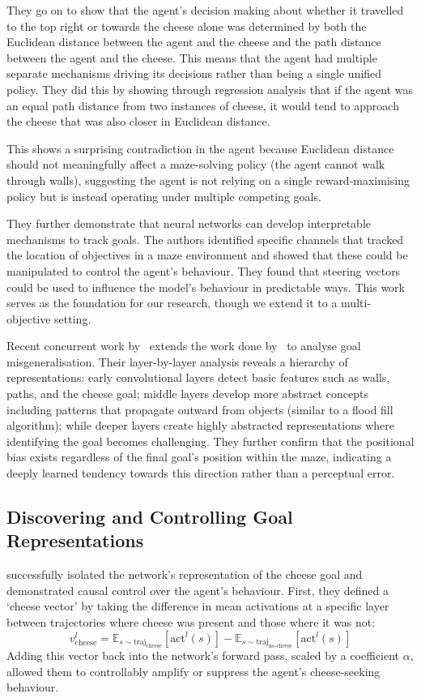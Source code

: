 They go on to show that the agent's decision making about whether it travelled to the top right or towards the cheese alone was determined by both the Euclidean distance between the agent and the cheese and the path distance between the agent and the cheese. This means that the agent had multiple separate mechanisms driving its decisions rather than being a single unified policy. They did this by showing through regression analysis that if the agent was an equal path distance from two instances of cheese, it would tend to approach the cheese that was also closer in Euclidean distance. 

This shows a surprising contradiction in the agent because Euclidean distance should not meaningfully affect a maze-solving policy (the agent cannot walk through walls), suggesting the agent is not relying on a single reward-maximising policy but is instead operating under multiple competing goals.

They further demonstrate that neural networks can develop interpretable mechanisms to track goals. The authors identified specific channels that tracked the location of objectives in a maze environment and showed that these could be manipulated to control the agent's behaviour. They found that steering vectors could be used to influence the model's behaviour in predictable ways. This work serves as the foundation for our research, though we extend it to a multi-objective setting.

Recent concurrent work by~\citet{trim_2024_mechanistic} extends the work done by~\citet{mini_2023_understanding} to analyse goal misgeneralisation. Their layer-by-layer analysis reveals a hierarchy of representations: early convolutional layers detect basic features such as walls, paths, and the cheese goal; middle layers develop more abstract concepts including patterns that propagate outward from objects (similar to a flood fill algorithm); while deeper layers create highly abstracted representations where identifying the goal becomes challenging. They further confirm that the positional bias exists regardless of the final goal's position within the maze, indicating a deeply learned tendency towards this direction rather than a perceptual error.

\subsection{Discovering and Controlling Goal Representations}
\citet{mini_2023_understanding} successfully isolated the network's representation of the cheese goal and demonstrated causal control over the agent's behaviour. First, they defined a `cheese vector' by taking the difference in mean activations at a specific layer between trajectories where cheese was present and those where it was not:
\[
v_{\text{cheese}}^{l} = \mathbb{E}_{s \sim \text{traj}_{\text{cheese}}}[\text{act}^{l}(s)] - \mathbb{E}_{s \sim \text{traj}_{\text{no-cheese}}}[\text{act}^{l}(s)]
\]
Adding this vector back into the network's forward pass, scaled by a coefficient $\alpha$, allowed them to controllably amplify or suppress the agent's cheese-seeking behaviour.

